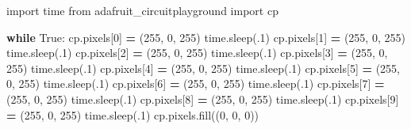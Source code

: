 \documentclass[
]{book}
\newenvironment{Shaded}{\begin{snugshade}}{\end{snugshade}}
\newcommand{\ControlFlowTok}[1]{\textcolor[rgb]{0.13,0.29,0.53}{\textbf{#1}}}
\newcommand{\DecValTok}[1]{\textcolor[rgb]{0.00,0.00,0.81}{#1}}
\newcommand{\ImportTok}[1]{#1}
\newcommand{\NormalTok}[1]{#1}
\newcommand{\OperatorTok}[1]{\textcolor[rgb]{0.81,0.36,0.00}{\textbf{#1}}}
\newcommand{\VariableTok}[1]{\textcolor[rgb]{0.00,0.00,0.00}{#1}}
\begin{document}
\begin{Shaded}
\begin{Highlighting}[]
\ImportTok{import}\NormalTok{ time}
\ImportTok{from}\NormalTok{ adafruit_circuitplayground }\ImportTok{import}\NormalTok{ cp}
 
\ControlFlowTok{while} \VariableTok{True}\NormalTok{:}
\NormalTok{    cp.pixels[}\DecValTok{0}\NormalTok{] }\OperatorTok{=}\NormalTok{ (}\DecValTok{255}\NormalTok{, }\DecValTok{0}\NormalTok{, }\DecValTok{255}\NormalTok{) }
\NormalTok{    time.sleep(.}\DecValTok{1}\NormalTok{)}
\NormalTok{    cp.pixels[}\DecValTok{1}\NormalTok{] }\OperatorTok{=}\NormalTok{ (}\DecValTok{255}\NormalTok{, }\DecValTok{0}\NormalTok{, }\DecValTok{255}\NormalTok{)}
\NormalTok{    time.sleep(.}\DecValTok{1}\NormalTok{)}
\NormalTok{    cp.pixels[}\DecValTok{2}\NormalTok{] }\OperatorTok{=}\NormalTok{ (}\DecValTok{255}\NormalTok{, }\DecValTok{0}\NormalTok{, }\DecValTok{255}\NormalTok{)}
\NormalTok{    time.sleep(.}\DecValTok{1}\NormalTok{)}
\NormalTok{    cp.pixels[}\DecValTok{3}\NormalTok{] }\OperatorTok{=}\NormalTok{ (}\DecValTok{255}\NormalTok{, }\DecValTok{0}\NormalTok{, }\DecValTok{255}\NormalTok{)}
\NormalTok{    time.sleep(.}\DecValTok{1}\NormalTok{)}
\NormalTok{    cp.pixels[}\DecValTok{4}\NormalTok{] }\OperatorTok{=}\NormalTok{ (}\DecValTok{255}\NormalTok{, }\DecValTok{0}\NormalTok{, }\DecValTok{255}\NormalTok{)}
\NormalTok{    time.sleep(.}\DecValTok{1}\NormalTok{)}
\NormalTok{    cp.pixels[}\DecValTok{5}\NormalTok{] }\OperatorTok{=}\NormalTok{ (}\DecValTok{255}\NormalTok{, }\DecValTok{0}\NormalTok{, }\DecValTok{255}\NormalTok{)}
\NormalTok{    time.sleep(.}\DecValTok{1}\NormalTok{)}
\NormalTok{    cp.pixels[}\DecValTok{6}\NormalTok{] }\OperatorTok{=}\NormalTok{ (}\DecValTok{255}\NormalTok{, }\DecValTok{0}\NormalTok{, }\DecValTok{255}\NormalTok{)}
\NormalTok{    time.sleep(.}\DecValTok{1}\NormalTok{)}
\NormalTok{    cp.pixels[}\DecValTok{7}\NormalTok{] }\OperatorTok{=}\NormalTok{ (}\DecValTok{255}\NormalTok{, }\DecValTok{0}\NormalTok{, }\DecValTok{255}\NormalTok{)}
\NormalTok{    time.sleep(.}\DecValTok{1}\NormalTok{)}
\NormalTok{    cp.pixels[}\DecValTok{8}\NormalTok{] }\OperatorTok{=}\NormalTok{ (}\DecValTok{255}\NormalTok{, }\DecValTok{0}\NormalTok{, }\DecValTok{255}\NormalTok{)}
\NormalTok{    time.sleep(.}\DecValTok{1}\NormalTok{)}
\NormalTok{    cp.pixels[}\DecValTok{9}\NormalTok{] }\OperatorTok{=}\NormalTok{ (}\DecValTok{255}\NormalTok{, }\DecValTok{0}\NormalTok{, }\DecValTok{255}\NormalTok{)}
\NormalTok{    time.sleep(.}\DecValTok{1}\NormalTok{)}
\NormalTok{    cp.pixels.fill((}\DecValTok{0}\NormalTok{, }\DecValTok{0}\NormalTok{, }\DecValTok{0}\NormalTok{))}

\end{Highlighting}
\end{Shaded}
\end{document}
